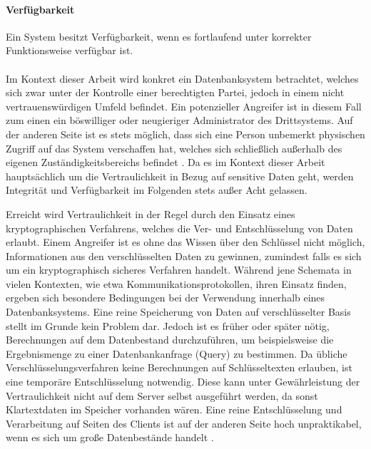 \paragraph{Verfügbarkeit}
Ein System besitzt Verfügbarkeit, wenn es fortlaufend unter korrekter Funktionsweise verfügbar ist.

\paragraph{}
Im Kontext dieser Arbeit wird konkret ein Datenbanksystem betrachtet, welches sich zwar unter der Kontrolle einer berechtigten Partei, jedoch in einem nicht vertrauenswürdigen Umfeld befindet. Ein potenzieller Angreifer ist in diesem Fall zum einen ein böswilliger oder neugieriger Administrator des Drittsystems. Auf der anderen Seite ist es stets möglich, dass sich eine Person unbemerkt physischen Zugriff auf das System verschaffen hat, welches sich schließlich außerhalb des eigenen Zuständigkeitsbereichs befindet \cite{Popa2012}. Da es im Kontext dieser Arbeit hauptsächlich um die Vertraulichkeit in Bezug auf sensitive Daten geht, werden Integrität und Verfügbarkeit im Folgenden stets außer Acht gelassen. 

Erreicht wird Vertraulichkeit in der Regel durch den Einsatz eines kryptographischen Verfahrens, welches die Ver- und Entschlüsselung von Daten erlaubt. Einem Angreifer ist es ohne das Wissen über den Schlüssel nicht möglich, Informationen aus den verschlüsselten Daten zu gewinnen, zumindest falls es sich um ein kryptographisch sicheres Verfahren handelt. Während jene Schemata in vielen Kontexten, wie etwa Kommunikationsprotokollen, ihren Einsatz finden, ergeben sich besondere Bedingungen bei der Verwendung innerhalb eines Datenbanksystems. Eine reine Speicherung von Daten auf verschlüsselter Basis stellt im Grunde kein Problem dar. Jedoch ist es früher oder später nötig, Berechnungen auf dem Datenbestand durchzuführen, um beispielsweise die Ergebnismenge zu einer Datenbankanfrage (Query) zu bestimmen. Da übliche Verschlüsselungsverfahren keine Berechnungen auf Schlüsseltexten erlauben, ist eine temporäre Entschlüsselung notwendig. Diese kann unter Gewährleistung der Vertraulichkeit nicht auf dem Server selbst ausgeführt werden, da sonst Klartextdaten im Speicher vorhanden wären. Eine reine Entschlüsselung und Verarbeitung auf Seiten des Clients ist auf der anderen Seite hoch unpraktikabel, wenn es sich um große Datenbestände handelt \cite{Popa2012}.

